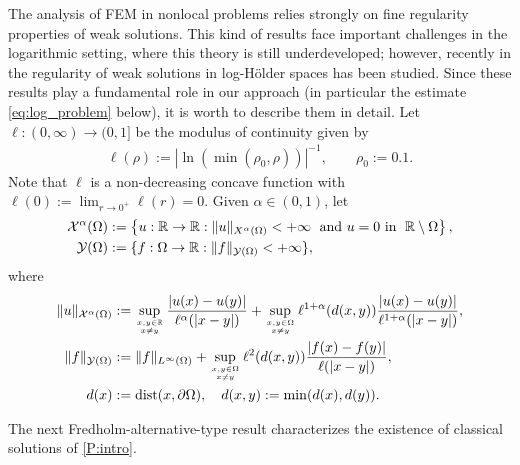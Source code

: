 \documentclass[10 pt]{article}
\numberwithin{equation}{section}
\def\dist{\operatorname{dist}}
\def\R{\mathbb{R}}
\begin{document}
The analysis of FEM in nonlocal problems relies strongly on fine regularity properties of weak solutions. This kind of results face important challenges in the logarithmic setting, where this theory is still underdeveloped; however, recently in \cite{CS22} the regularity of weak solutions in log-Hölder spaces has been studied.  Since these results play a fundamental role in our approach (in particular the estimate \eqref{eq:log_problem} below), it is worth to describe them in detail. Let $\ell:(0,\infty)\to (0,1]$ be the modulus of continuity given by
\begin{align}\label{ell:def}
\ell(\rho) := |\ln(\min(\rho_0,\rho))|^{-1}, \qquad\rho_0:=0.1.
\end{align}
Note that $\ell$ is a non-decreasing concave function with $\ell(0) := \lim_{r\to0^+}\ell(r)=0$. Given $\alpha\in(0,1)$, let
%
\begin{align*}
    \mathcal X^\alpha(\Omega)&:=\left\{u:\mathbb R\to \mathbb R:\|u\|_{X^\alpha(\Omega)}<+\infty \;\textnormal{ and $u=0$ in }\; \R\setminus \Omega\right\}, \\
    \mathcal Y(\Omega)&:=\{f:\Omega\to \mathbb R:\|f\|_{\mathcal Y(\Omega)}<+\infty\},
\end{align*}
%
where
%
\begin{align*}
    \|u\|_{\mathcal X^\alpha(\Omega)}&:=\sup_{x,y\in\mathbb R \atop x\neq y}\frac{|u(x)-u(y)|}{\ell^{\alpha}(|x-y|)}+\sup_{x,y\in\Omega \atop x\neq y}\ell^{1+\alpha}(d(x,y))\frac{|u(x)-u(y)|}{\ell^{1+\alpha}(|x-y|)}, \\
    \|f\|_{\mathcal Y(\Omega)}&:=\|f\|_{L^\infty(\Omega)}+\sup_{x,y\in\Omega \atop x\neq y}\ell^{2}(d(x,y))\frac{|f(x)-f(y)|}{\ell(|x-y  |)}, \\
    d(x)&:=\dist(x,\partial \Omega), \quad d(x,y):=\min(d(x),d(y)).
\end{align*}

The next Fredholm-alternative-type result characterizes the existence of classical solutions of \eqref{P:intro}.
\end{document}
